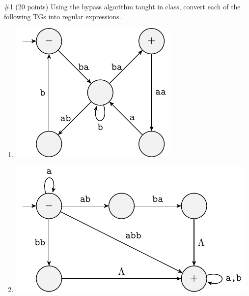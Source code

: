 \begin{problem}{\#1 (20 points)}
    Using the bypass algorithm taught in class, convert each of the following TGs into regular expressions.
    \begin{enumerate}[label={\bf \alph*)}]
        \item \includegraphics[]{figures/question/Question1A.pdf}
        \item \includegraphics[]{figures/question/Question1B.pdf}
    \end{enumerate}
\end{problem}
\vspace{2em}
